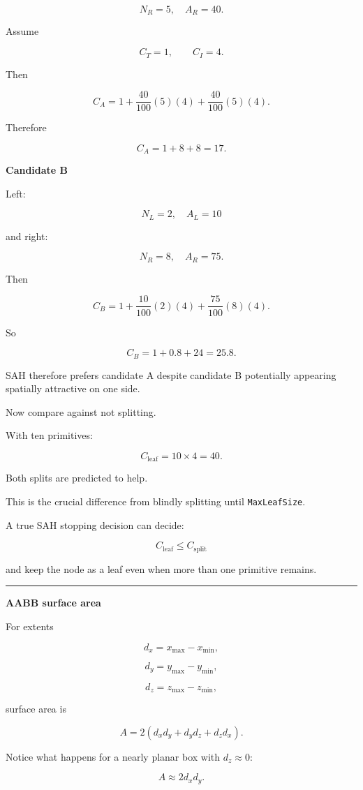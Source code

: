 \[
N_R=5,\quad A_R=40.
\]

Assume

\[
C_T=1,
\qquad
C_I=4.
\]

Then

\[
C_A
=
1+
\frac{40}{100}(5)(4)
+
\frac{40}{100}(5)(4).
\]

Therefore

\[
C_A=1+8+8=17.
\]

\textbf{Candidate B}

Left:

\[
N_L=2,\quad A_L=10
\]

and right:

\[
N_R=8,\quad A_R=75.
\]

Then

\[
C_B
=
1+
\frac{10}{100}(2)(4)
+
\frac{75}{100}(8)(4).
\]

So

\[
C_B=1+0.8+24=25.8.
\]

SAH therefore prefers candidate A despite candidate B potentially appearing spatially attractive on one side.

Now compare against not splitting.

With ten primitives:

\[
C_{\text{leaf}}
=
10\times4
=
40.
\]

Both splits are predicted to help.

This is the crucial difference from blindly splitting until \texttt{MaxLeafSize}.

A true SAH stopping decision can decide:

\[
C_{\text{leaf}}
\le C_{\text{split}}
\]

and keep the node as a leaf even when more than one primitive remains.

\begin{center}\rule{0.5\linewidth}{0.5pt}\end{center}

\textbf{AABB surface area}

For extents

\[
d_x=x_{\max}-x_{\min},
\]

\[
d_y=y_{\max}-y_{\min},
\]

\[
d_z=z_{\max}-z_{\min},
\]

surface area is

\[
\boxed{
A=2(d_xd_y+d_yd_z+d_zd_x).
}
\]

Notice what happens for a nearly planar box with \(d_z\approx0\):

\[
A\approx2d_xd_y.
\]

